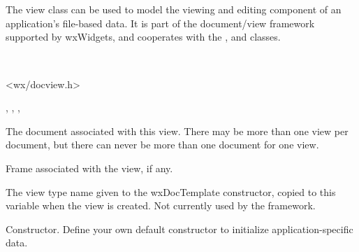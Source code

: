 \section{}\label{wxview}

The view class can be used to model the viewing and editing component of
an application's file-based data. It is part of the document/view framework supported by wxWidgets,
and cooperates with the ,  
and  classes.


\\


<wx/docview.h>


, , ,\rtfsp
{}




The document associated with this view. There may be more than one view per
document, but there can never be more than one document for one view.



Frame associated with the view, if any.



The view type name given to the wxDocTemplate constructor, copied to this
variable when the view is created. Not currently used by the framework.



Constructor. Define your own default constructor to initialize application-specific
data.



